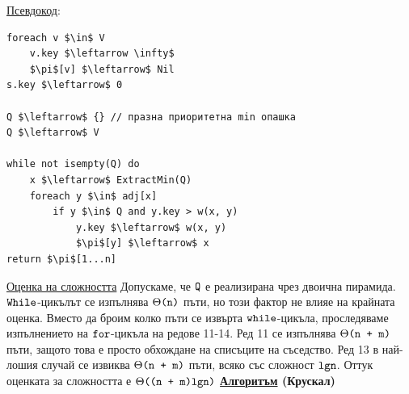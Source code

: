 \documentclass{article}
\begin{document}
\underline{Псевдокод}:
\begin{lstlisting}[style=CStyle]
foreach v $\in$ V
    v.key $\leftarrow \infty$
    $\pi$[v] $\leftarrow$ Nil
s.key $\leftarrow$ 0

Q $\leftarrow$ {} // празна приоритетна min опашка
Q $\leftarrow$ V

while not isempty(Q) do
    x $\leftarrow$ ExtractMin(Q)
    foreach y $\in$ adj[x]
        if y $\in$ Q and y.key > w(x, y)
            y.key $\leftarrow$ w(x, y)
            $\pi$[y] $\leftarrow$ x
return $\pi$[1...n]
\end{lstlisting}
\underline{Оценка на сложността} \newline\newline
Допускаме, че $\textnormal{\textcolor{black}{\texttt{Q}}}$ е реализирана чрез двоична пирамида. $\textnormal{\textcolor{black}{\texttt{While}}}$-цикълът се изпълнява
$\Theta\textnormal{\textcolor{black}{\texttt{(n)}}}$ пъти, но този фактор не влияе на крайната оценка. Вместо да броим колко пъти се извърта $\textnormal{\textcolor{black}{\texttt{while}}}$-цикъла,
проследяваме изпълнението на $\textnormal{\textcolor{black}{\texttt{for}}}$-цикъла на редове 11-14. Ред 11 се изпълнява $\Theta\textnormal{\textcolor{black}{\texttt{(n + m)}}}$ пъти, защото това е просто
обхождане на списъците на съседство. Ред 13 в най-лошия случай се извиква $\Theta\textnormal{\textcolor{black}{\texttt{(n + m)}}}$ пъти, всяко със сложност $\textnormal{\textcolor{black}{\texttt{lgn}}}$.
Оттук оценката за сложността е $\Theta\textnormal{\textcolor{black}{\texttt{((n + m)lgn)}}}$ \newline\newline
\textbf{\underline{Алгоритъм} (Крускал)} \newline\newline
\end{document}
